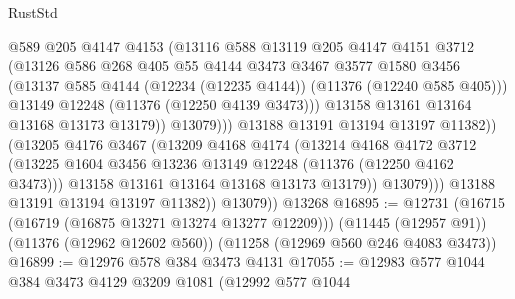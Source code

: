\begin{lexlean}{RustStd}
\begin{coremodule}
{{{{{{{{{{{{{{{{{{{                            @589
                            @205
                            @4147
                            @4153
                            (@13116
                              @588
                              @13119
                              @205
                              @4147
                              @4151
                              @3712
                              (@13126
                                @586
                                @268
                                @405
                                @55
                                @4144
                                @3473
                                @3467
                                @3577
                                @1580
                                @3456
                                (@13137
                                  @585
                                  @4144
                                  (@12234 (@12235 @4144))
                                  (@11376 (@12240 @585 @405)))
                                @13149
                                @12248
                                (@11376 (@12250 @4139 @3473)))
                              @13158
                              @13161
                              @13164
                              @13168
                              @13173
                              @13179))
                          @13079)))
                    @13188
                    @13191
                    @13194
                    @13197
                    @11382))
                (@13205
                  @4176
                  @3467
                  (@13209
                    @4168
                    @4174
                    (@13214
                      @4168
                      @4172
                      @3712
                      (@13225 @1604 @3456 @13236 @13149 @12248 (@11376 (@12250 @4162 @3473)))
                      @13158
                      @13161
                      @13164
                      @13168
                      @13173
                      @13179))
                  @13079)))
            @13188
            @13191
            @13194
            @13197
            @11382))
        @13079))
    @13268
@16895 := @12731
    (@16715 (@16719 (@16875 @13271 @13274 @13277 @12209)))
    (@11445 (@12957 @91))
    (@11376 (@12962 @12602 @560))
    (@11258 (@12969 @560 @246 @4083 @3473))
@16899 := @12976 @578 @384 @3473 @4131
@17055 := @12983
    @577
    @1044
    @384
    @3473
    @4129
    @3209
    @1081
    (@12992
      @577
      @1044
}}}}}}}}}}}}}}}}}}}
\end{coremodule}
\end{lexlean}
